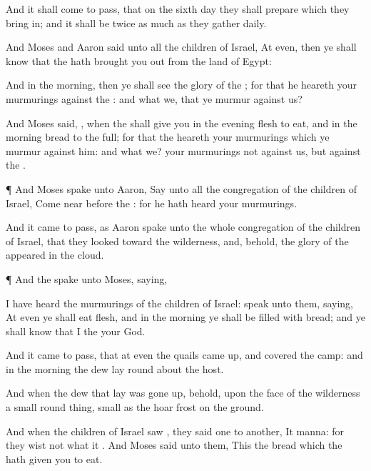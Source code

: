 {And it shall come to pass, that on the
sixth
day they shall
prepare
{}
which they bring
in; and it shall be
twice as much as they
gather
daily.

And
Moses and
Aaron
said unto all the
children of
Israel, At
even, then ye shall
know that the
{} hath brought you
out from the
land of
Egypt:

And in the
morning, then ye shall
see the
glory of the
{}; for that he
heareth your
murmurings against the
{}: and what
{}
we, that ye
murmur against us?

And
Moses
said,
{}, when the
{} shall
give you in the
evening
flesh to
eat, and in the
morning
bread to the
full; for that the
{}
heareth your
murmurings which ye
murmur against him: and what
{}
we? your
murmurings
{} not against us, but against the
{}.


\par }{\PP {}¶ And
Moses
spake unto
Aaron,
Say unto all the
congregation of the
children of
Israel, Come
near
before the
{}: for he hath
heard your
murmurings.

And it came to pass, as
Aaron
spake unto the whole
congregation of the
children of
Israel, that they
looked toward the
wilderness, and, behold, the
glory of the
{}
appeared in the
cloud.


\par }{\PP {}¶ And the
{}
spake unto
Moses,
saying,

I have
heard the
murmurings of the
children of
Israel:
speak unto them,
saying, At
even ye shall
eat
flesh, and in the
morning ye shall be
filled with
bread; and ye shall
know that I
{} the
{} your
God.


\par }{\PP {}And it came to pass, that at
even the
quails came
up, and
covered the
camp: and in the
morning the
dew
lay round
about the
host.

And when the
dew that
lay was gone
up, behold, upon the
face of the
wilderness
{} a
small round
thing,
{}
small as the hoar
frost on the
ground.

And when the
children of
Israel
saw
{}, they
said
one to
another, It
{}
manna: for they
wist not what it
{}. And
Moses
said unto them, This
{} the
bread which the
{} hath
given you to
eat.


}
